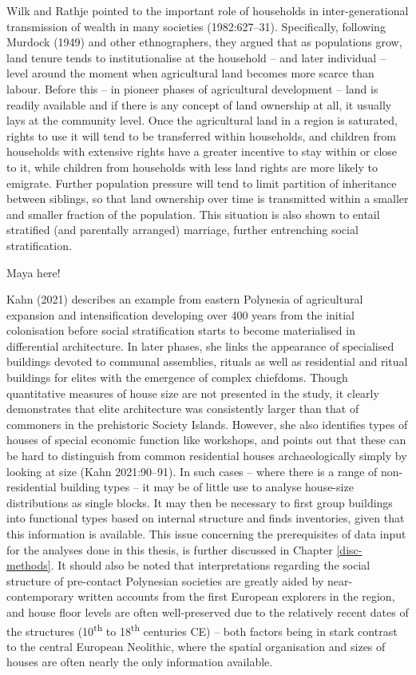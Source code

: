 \documentclass[
  12pt,
]{book}
\begin{document}
Wilk and Rathje pointed to the important role of households in inter-generational transmission of wealth in many societies (1982:627--31). Specifically, following Murdock (1949) and other ethnographers, they argued that as populations grow, land tenure tends to institutionalise at the household -- and later individual -- level around the moment when agricultural land becomes more scarce than labour. Before this -- in pioneer phases of agricultural development -- land is readily available and if there is any concept of land ownership at all, it usually lays at the community level. Once the agricultural land in a region is saturated, rights to use it will tend to be transferred within households, and children from households with extensive rights have a greater incentive to stay within or close to it, while children from households with less land rights are more likely to emigrate. Further population pressure will tend to limit partition of inheritance between siblings, so that land ownership over time is transmitted within a smaller and smaller fraction of the population. This situation is also shown to entail stratified (and parentally arranged) marriage, further entrenching social stratification.

Maya here!

Kahn (2021) describes an example from eastern Polynesia of agricultural expansion and intensification developing over 400 years from the initial colonisation before social stratification starts to become materialised in differential architecture. In later phases, she links the appearance of specialised buildings devoted to communal assemblies, rituals as well as residential and ritual buildings for elites with the emergence of complex chiefdoms. Though quantitative measures of house size are not presented in the study, it clearly demonstrates that elite architecture was consistently larger than that of commoners in the prehistoric Society Islands. However, she also identifies types of houses of special economic function like workshops, and points out that these can be hard to distinguish from common residential houses archaeologically simply by looking at size (Kahn 2021:90--91). In such cases -- where there is a range of non-residential building types -- it may be of little use to analyse house-size distributions as single blocks. It may then be necessary to first group buildings into functional types based on internal structure and finds inventories, given that this information is available. This issue concerning the prerequisites of data input for the analyses done in this thesis, is further discussed in Chapter \ref{disc-methods}. It should also be noted that interpretations regarding the social structure of pre-contact Polynesian societies are greatly aided by near-contemporary written accounts from the first European explorers in the region, and house floor levels are often well-preserved due to the relatively recent dates of the structures (10\textsuperscript{th} to 18\textsuperscript{th} centuries CE) -- both factors being in stark contrast to the central European Neolithic, where the spatial organisation and sizes of houses are often nearly the only information available.
\end{document}
